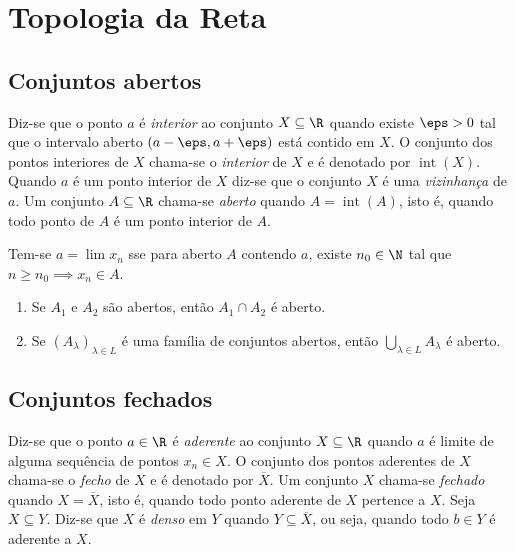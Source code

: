 \documentclass{article}
\begin{document}
\section{Topologia da Reta}
\subsection{Conjuntos abertos}

\begin{defn}
    Diz-se que o ponto \(a\) é \emph{interior} ao conjunto \(X \subseteq \R\) quando existe \(\eps > 0\) tal que o intervalo aberto \((a - \eps, a + \eps)\) está contido em \(X\). O conjunto dos pontos interiores de \(X\) chama-se o \emph{interior} de \(X\) e é denotado por \(\operatorname{int}(X)\).
    Quando \(a\) é um ponto interior de \(X\) diz-se que o conjunto \(X\) é uma \emph{vizinhança} de \(a\). Um conjunto \(A \subseteq \R\) chama-se \emph{aberto} quando \(A = \operatorname{int}(A)\), isto é, quando todo ponto de \(A\) é um ponto interior de \(A\).
\end{defn}

\begin{prop}
    Tem-se \(a = \lim x_n\) sse para aberto \(A\) contendo \(a\), existe \(n_0 \in \N\) tal que \(n \geq n_0 \implies x_n \in A\).
\end{prop}

\begin{thm} 
    \begin{enumerate}
        \item [(a)] Se \(A_1\) e \(A_2\) são abertos, então \(A_1 \cap A_2\) é aberto.
        \item [(b)] Se \((A_\lambda)_{\lambda \in L}\) é uma família de conjuntos abertos, então \(\bigcup_{\lambda \in L} A_\lambda\) é aberto.
    \end{enumerate}
\end{thm}

\subsection{Conjuntos fechados}

\begin{defn}
    Diz-se que o ponto \(a \in \R\) é \emph{aderente} ao conjunto \(X \subseteq \R\) quando \(a\) é limite de alguma sequência de pontos \(x_n \in X\). O conjunto dos pontos aderentes de \(X\) chama-se o \emph{fecho} de \(X\) e é denotado por \(\overline{X}\).
    Um conjunto \(X\) chama-se \emph{fechado} quando \(X = \overline{X}\), isto é, quando todo ponto aderente de \(X\) pertence a \(X\). Seja \(X \subseteq Y\). Diz-se que \(X\) é \emph{denso} em \(Y\) quando \(Y \subseteq \overline{X}\), ou seja, quando todo \(b \in Y\) é aderente a \(X\).
\end{defn}
\end{document}
